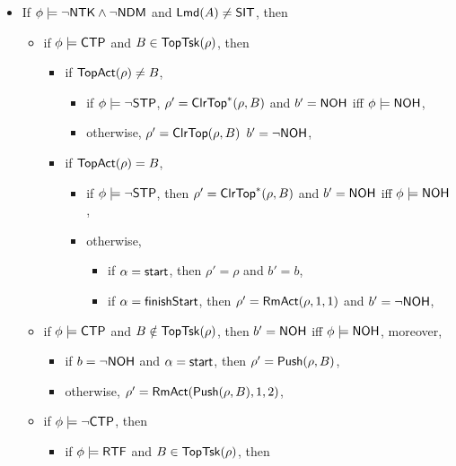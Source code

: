 \smallskip

\noindent {}
\begin{itemize}
	\item If $\phi \models \neg {\sf NTK}\wedge\neg{\sf NDM}$ and ${\sf Lmd}(A)\neq {\sf SIT}$, then
	\begin{itemize}
		\item if $\phi \models {\sf CTP}$ and $B \in \mathsf{TopTsk}(\rho)$, then 
		\begin{itemize}
			\item if $\mathsf{TopAct}(\rho) \neq B$, 
			\begin{itemize}
			\item if $\phi \models \neg {\sf STP}$, $\rho' = \mathsf{ClrTop}^*(\rho, B)$ and $b' = {\sf NOH}$ iff $\phi \models {\sf NOH}$, 
			\item otherwise, $\rho' = \mathsf{ClrTop}(\rho, B)$ $b' = \neg {\sf NOH}$,
			\end{itemize}
			\item if $\mathsf{TopAct}(\rho) = B$, 
			\begin{itemize}
			 	\item if $\phi \models \neg {\sf STP}$, then $\rho' = \mathsf{ClrTop}^*(\rho, B)$ and $b' = {\sf NOH}$ iff $\phi \models {\sf NOH}$, 
				\item otherwise, 
				\begin{itemize}
					\item if $\alpha = {\mathsf{start} }$, then $\rho' = \rho$ and $b' = b$,
					\item if $\alpha = {\mathsf{finishStart} }$, then $\rho' = \mathsf{RmAct}(\rho, 1, 1)$ and $b' = \neg{\sf NOH}$,
				\end{itemize}
			\end{itemize}
		\end{itemize}
		\item if $\phi \models {\sf CTP}$ and $B \notin \mathsf{TopTsk}(\rho)$, then $b' = {\sf NOH}$ iff $\phi \models {\sf NOH}$, moreover,
		\begin{itemize}
			\item if $b = \neg {\sf NOH}$ and $\alpha = {\mathsf{start} }$, then $\rho' = \mathsf{Push}(\rho, B)$, 
			\item otherwise, $\rho' = \mathsf{RmAct}( \mathsf{Push}(\rho, B), 1, 2)$,
		\end{itemize}
		\item if $\phi \models \neg {\sf CTP}$, then
		\begin{itemize}
			\item if $\phi \models {\sf RTF}$ and $B \in \mathsf{TopTsk}(\rho)$, then
			\begin{itemize}

\end{itemize}
\end{itemize}
\end{itemize}
\end{itemize}
